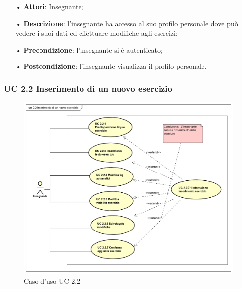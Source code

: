 
\begin{itemize}
	\item[•] \textbf{Attori}: Insegnante;
	\item[•] \textbf{Descrizione}: l’insegnante ha accesso al suo profilo personale dove può vedere i suoi dati ed effettuare modifiche agli esercizi;

	\item[•] \textbf{Precondizione}: l'insegnante si è autenticato;

	\item[•] \textbf{Postcondizione}: l'insegnante visualizza il profilo personale.

\end{itemize}


\subsubsection{UC 2.2 Inserimento di un nuovo esercizio}

\begin{figure}[H]
	\centering
	\includegraphics[width=17cm]{img/UC22.png} 
	\caption{Caso d'uso UC 2.2;}
\end{figure}


